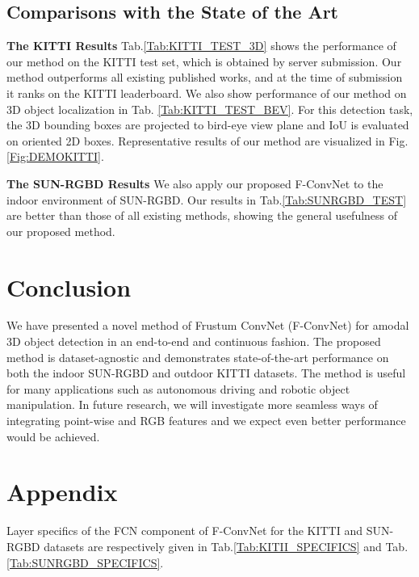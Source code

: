 \documentclass[letterpaper, 10 pt, conference]{ieeeconf}
\begin{document}
\subsection{Comparisons with the State of the Art}

\noindent\textbf{The KITTI Results} Tab.\ref{Tab:KITTI_TEST_3D} shows the performance of our method on the KITTI test set, which is obtained by server submission. Our method outperforms all existing published works, and at the time of submission it ranks  on the KITTI leaderboard.  We also show performance of our method on 3D object localization in Tab. \ref{Tab:KITTI_TEST_BEV}. For this detection task, the 3D bounding boxes are projected to bird-eye view plane and IoU is evaluated on oriented 2D boxes. Representative results of our method are visualized in Fig.\ref{Fig:DEMOKITTI}.

\vspace{0.1cm}
\noindent\textbf{The SUN-RGBD Results} We also apply our proposed F-ConvNet to the indoor environment of SUN-RGBD. Our results in Tab.\ref{Tab:SUNRGBD_TEST} are better than those of all existing methods, showing the general usefulness of our proposed method.

\section{Conclusion}

We have presented a novel method of Frustum ConvNet (F-ConvNet) for amodal 3D object detection in an end-to-end and continuous fashion. The proposed method is dataset-agnostic and demonstrates state-of-the-art performance on both the indoor SUN-RGBD and outdoor KITTI datasets. The method is useful for many applications such as autonomous driving and robotic object manipulation. In future research, we will investigate more seamless ways of integrating point-wise and RGB features and we expect even better performance would be achieved.




\section*{Appendix}

Layer specifics of the FCN component of F-ConvNet for the KITTI and SUN-RGBD datasets are respectively given in Tab.\ref{Tab:KITII_SPECIFICS} and Tab.\ref{Tab:SUNRGBD_SPECIFICS}.
\end{document}
